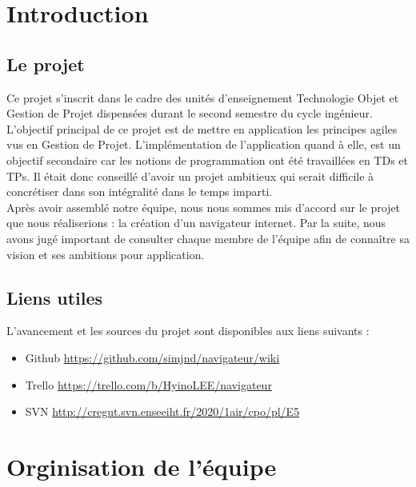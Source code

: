 \documentclass[10pt,a4paper]{article}
\begin{document}
\thispagestyle{empty}


\thispagestyle{empty}
\tableofcontents

\newpage
\setcounter{page}{1}
\section{Introduction}
\subsection{Le projet}
Ce projet s'inscrit dans le cadre des unités d'enseignement Technologie Objet et Gestion de Projet dispensées durant le second semestre du cycle ingénieur. L'objectif principal de ce projet est de mettre en application les principes agiles vus en Gestion de Projet. L'implémentation de l'application quand à elle, est un objectif secondaire car les notions de programmation ont été travaillées en TDs et TPs. Il était donc conseillé d'avoir un projet ambitieux qui serait difficile à concrétiser dans son intégralité dans le temps imparti.\\

Après avoir assemblé notre équipe, nous nous sommes mis d’accord sur le projet que nous réaliserions : la création d'un navigateur internet. Par la suite, nous avons jugé important de consulter chaque membre de l’équipe afin de connaître sa vision et ses ambitions pour application. 

\subsection{Liens utiles}
L'avancement et les sources du projet sont disponibles aux liens suivants :
\begin{itemize}
\item Github \href{https://github.com/simjnd/navigateur/wiki}{https://github.com/simjnd/navigateur/wiki}
\item Trello \href{https://trello.com/b/HyinoLEE/navigateur}{https://trello.com/b/HyinoLEE/navigateur} 
\item SVN \href{http://cregut.svn.enseeiht.fr/2020/1air/cpo/pl/E5}{http://cregut.svn.enseeiht.fr/2020/1air/cpo/pl/E5}
\end{itemize}

\newpage

\section{Orginisation de l'équipe}
\end{document}

